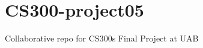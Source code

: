\chapter{CS300-\/project05}
\hypertarget{md_README}{}\label{md_README}
\label{md_README_autotoc_md0}%
%
Collaborative repo for CS300\textquotesingle{}s Final Project at UAB 
